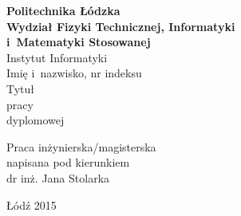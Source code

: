 \begin{titlepage}
\begin{center}
\textbf{{\large Politechnika Łódzka}\\}
\vspace{\medskipamount}
\textbf{\large Wydział Fizyki Technicznej, Informatyki\\i~Matematyki Stosowanej}
\vspace{\medskipamount}\\
{\large Instytut Informatyki}\\
\vspace{2.5cm}
{\Large {\color{red}Imię i~nazwisko, nr indeksu\\}}
\vspace{2cm}
{\huge{ {\color{red}Tytuł\\pracy\\dyplomowej\\}}}
\end{center}
\vspace{3cm}
\hfill
\begin{minipage}{.55\columnwidth}
Praca {\color{red}inżynierska/magisterska}\\
napisana pod kierunkiem\\
dr inż. Jana Stolarka
\end{minipage}
\vfill
\begin{center}
Łódź {\color{red}2015}
\end{center}
\end{titlepage}
